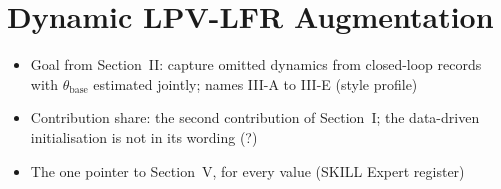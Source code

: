 \section{Dynamic LPV-LFR Augmentation}\label{sec:augmentation}
\ifdraft
\begin{itemize}
\item Goal from Section~II: capture omitted dynamics from closed-loop records with $\theta_{\mathrm{base}}$ estimated jointly; names III-A to III-E (style profile)
\item Contribution share: the second contribution of Section~I; the data-driven initialisation is not in its wording (?)
\item The one pointer to Section~V, for every value (SKILL Expert register)
\end{itemize}
\fi

